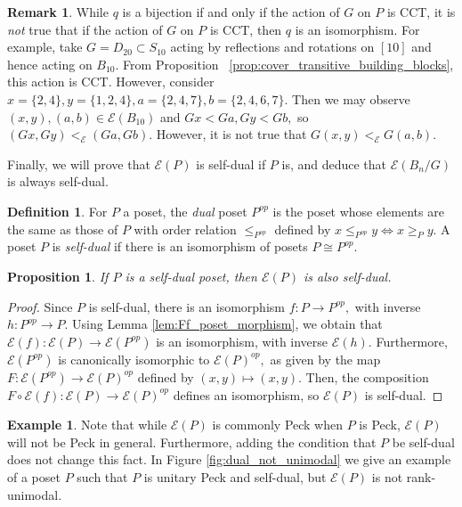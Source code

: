 \documentclass[10 pt]{amsart}
\theoremstyle{plain}
\newtheorem{prop}[thm]{Proposition}
\theoremstyle{definition}
\newtheorem{defn}[thm]{Definition}
\newtheorem{rem}[thm]{Remark}
\newtheorem{eg}[thm]{Example}
\theoremstyle{remark}
\numberwithin{equation}{section}
\renewcommand{\iff}{\Leftrightarrow}
\begin{document}
\begin{rem}
While $q$ is a bijection if and only if the action of $G$ on $P$ is CCT, it is {\it not} true that if the action of $G$ on $P$ is CCT, then $q$ is an isomorphism.  For example, take $G=D_{20} \subset S_{10}$ acting by reflections and rotations on $[10]$ and hence acting on $B_{10}.$ From Proposition ~\ref{prop:cover_transitive_building_blocks}, this action is CCT. However, consider $x = \{2,4\},y = \{1,2,4\},a = \{2,4,7\},b = \{2,4,6,7\}.$ Then we may observe $(x , y),(a, b) \in \mathcal E(B_{10})$ and $Gx < Ga, Gy < Gb,$ so $(Gx, Gy) <_{\mathcal E} (Ga, Gb).$ However, it is not true that $G(x, y)<_{\mathcal E} G(a,b)$.
\end{rem}

Finally, we will prove that $\mathcal E(P)$ is self-dual if $P$ is, and deduce that $\mathcal E(B_n/G)$ is always self-dual. 
\begin{defn}
For $P$ a poset, the {\it dual} poset $P^{op}$ is the poset whose elements are the same as those of $P$ with order relation $\le_{P^{op}}$ defined by $x \leq_{P^{op}} y \iff x \geq_P y.$ A poset $P$ is {\it self-dual} if there is an isomorphism of posets $P \cong P^{op}.$
\end{defn}

\begin{prop}
\label{prop:self_dual_preservation}
If $P$ is a self-dual poset, then $\mathcal E(P)$ is also self-dual.
\end{prop}
\begin{proof}
Since $P$ is self-dual, there is an isomorphism $f:P \rightarrow P^{op},$ with inverse $h:P^{op}\rightarrow P.$ Using Lemma \ref{lem:Ff_poset_morphism}, we obtain that $\mathcal E(f):\mathcal E(P) \rightarrow \mathcal E(P^{op})$ is an isomorphism, with inverse $\mathcal E(h).$ Furthermore, $\mathcal E(P^{op})$ is canonically isomorphic to $\mathcal E(P)^{op},$ as given by the map $F:\mathcal E(P^{op}) \rightarrow \mathcal E(P)^{op}$ defined by $(x,y) \mapsto (x,y).$ Then, the composition $F\circ \mathcal E(f):\mathcal E(P) \rightarrow \mathcal E(P)^{op}$ defines an isomorphism, so $\mathcal E(P)$ is self-dual.
\end{proof}

\begin{eg}
Note that while $\mathcal{E}(P)$ is commonly Peck when $P$ is Peck, $\mathcal E(P)$ will not be Peck in general.  Furthermore, adding the condition that $P$ be self-dual does not change this fact.  In Figure \ref{fig:dual_not_unimodal} we give an example of a poset $P$ such that $P$ is unitary Peck and self-dual, but $\mathcal{E}(P)$ is not rank-unimodal.
\end{eg}
\end{document}
